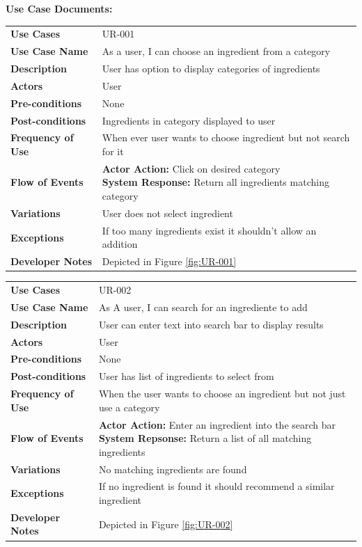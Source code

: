 \documentclass[12pt]{article}
\begin{document}
\textbf{Use Case Documents:} \\
  \begin{tabular}{ l | l }
    \hline
    \textbf{Use Cases} & UR-001 \\ \rowcolor[gray]{.95}
    \textbf{Use Case Name} & As a user, I can choose an ingredient from a category \\ 
    \textbf{Description} & User has option to display categories of ingredients \\ \rowcolor[gray]{.95}
    \textbf{Actors} & User \\
    \textbf{Pre-conditions} & None \\ \rowcolor[gray]{.95}
    \textbf{Post-conditions} & Ingredients in category displayed to user \\ 
    \textbf{Frequency of Use} & When ever user wants to choose ingredient but not search for it \\ \rowcolor[gray]{.95}
    \textbf{Flow of Events} & \pbox{20cm}{\textbf{Actor Action: } Click on desired category\\ \textbf{System Response:} Return
    all ingredients matching category} \\ 
    \textbf{Variations} & User does not select ingredient \\  \rowcolor[gray]{.95}
    \textbf{Exceptions} & If too many ingredients exist it shouldn't allow an addition \\
    \textbf{Developer Notes} & Depicted in Figure \ref{fig:UR-001} \\ \hline
  \end{tabular}


  \begin{tabular}{ l | l }
    \hline
    \textbf{Use Cases} & UR-002 \\ \rowcolor[gray]{.95}
    \textbf{Use Case Name} & As A user, I can search for an ingrediente to add  \\ 
    \textbf{Description} & User can enter text into search bar to display results \\ \rowcolor[gray]{.95}
    \textbf{Actors} & User \\
    \textbf{Pre-conditions} & None \\ \rowcolor[gray]{.95}
    \textbf{Post-conditions} & User has list of ingredients to select from \\ 
    \textbf{Frequency of Use} & When the user wants to choose an ingredient but not just use a category \\ \rowcolor[gray]{.95}
    \textbf{Flow of Events} & \pbox{20cm}{\textbf{Actor Action: }Enter an ingredient into the search bar \\
    \textbf{System Repsonse:} Return a list of all matching ingredients }  \\
    \textbf{Variations} & No matching ingredients are found \\  \rowcolor[gray]{.95}
    \textbf{Exceptions} & If no ingredient is found it should recommend a similar ingredient \\
    \textbf{Developer Notes} &  Depicted in Figure \ref{fig:UR-002}\\ \hline
  \end{tabular}
 
\end{document}
